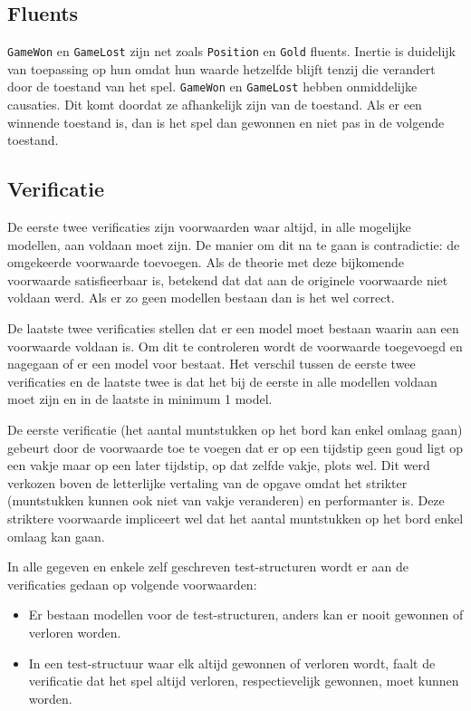 \documentclass[a4paper,12pt]{article}
\begin{document}
\subsection{Fluents}
\texttt{GameWon} en \texttt{GameLost} zijn net zoals \texttt{Position} en \texttt{Gold} fluents. Inertie is duidelijk van toepassing op hun omdat hun waarde hetzelfde blijft tenzij die verandert door de toestand van het spel. \texttt{GameWon} en \texttt{GameLost} hebben onmiddelijke causaties. Dit komt doordat ze afhankelijk zijn van de toestand. Als er een winnende toestand is, dan is het spel dan gewonnen en niet pas in de volgende toestand.

\subsection{Verificatie}
De eerste twee verificaties zijn voorwaarden waar altijd, in alle mogelijke modellen, aan voldaan moet zijn. De manier om dit na te gaan is contradictie: de omgekeerde voorwaarde toevoegen. Als de theorie met deze bijkomende voorwaarde satisfieerbaar is, betekend dat dat aan de originele voorwaarde niet voldaan werd. Als er zo geen modellen bestaan dan is het wel correct.

De laatste twee verificaties stellen dat er een model moet bestaan waarin aan een voorwaarde voldaan is. Om dit te controleren wordt de voorwaarde toegevoegd en nagegaan of er een model voor bestaat. Het verschil tussen de eerste twee verificaties en de laatste twee is dat het bij de eerste in alle modellen voldaan moet zijn en in de laatste in minimum 1 model.

De eerste verificatie (het aantal muntstukken op het bord kan enkel omlaag gaan) gebeurt door de voorwaarde toe te voegen dat er op een tijdstip geen goud ligt op een vakje maar op een later tijdstip, op dat zelfde vakje, plots wel. Dit werd verkozen boven de letterlijke vertaling van de opgave omdat het strikter (muntstukken kunnen ook niet van vakje veranderen) en performanter is. Deze striktere voorwaarde impliceert wel dat het aantal muntstukken op het bord enkel omlaag kan gaan.

In alle gegeven en enkele zelf geschreven test-structuren wordt er aan de verificaties gedaan op volgende voorwaarden:
\begin{itemize}
\item Er bestaan modellen voor de test-structuren, anders kan er nooit gewonnen of verloren worden.
\item In een test-structuur waar elk altijd gewonnen of verloren wordt, faalt de verificatie dat het spel altijd verloren, respectievelijk gewonnen, moet kunnen worden.
\end{itemize}
\end{document}
